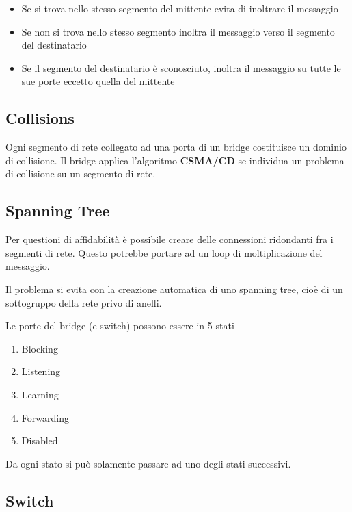 \documentclass[a4paper]{article}
\begin{document}
\begin{itemize}
    \item Se si trova nello stesso segmento del mittente evita di inoltrare il messaggio
    \item Se non si trova nello stesso segmento inoltra il messaggio verso il segmento del destinatario
    \item Se il segmento del destinatario è sconosciuto, inoltra il messaggio su tutte le sue porte eccetto
        quella del mittente
\end{itemize}

\pagebreak

\subsection{Collisions}

Ogni segmento di rete collegato ad una porta di un bridge costituisce un dominio di collisione.
Il bridge applica l'algoritmo \textbf{CSMA/CD} se individua un problema di collisione su un segmento di rete.

\subsection{Spanning Tree}

Per questioni di affidabilità è possibile creare delle connessioni ridondanti fra i segmenti di rete.
Questo potrebbe portare ad un loop di moltiplicazione del messaggio.

Il problema si evita con la creazione automatica di uno spanning tree, cioè di un sottogruppo della
rete privo di anelli.

Le porte del bridge (e switch) possono essere in 5 stati

\begin{enumerate}
    \item Blocking
    \item Listening
    \item Learning
    \item Forwarding
    \item Disabled
\end{enumerate}

Da ogni stato si può solamente passare ad uno degli stati successivi.

\subsection{Switch}
\end{document}

